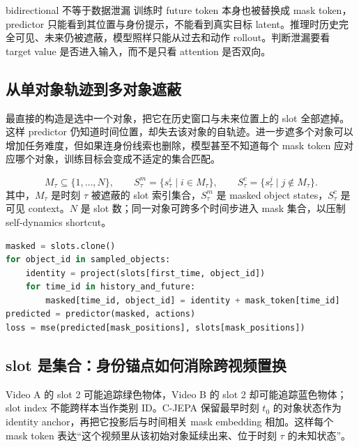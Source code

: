 \begin{warningbox}{bidirectional 不等于数据泄漏}
训练时 future token 本身也被替换成 mask token，predictor 只能看到其位置与身份提示，不能看到真实目标 latent。推理时历史完全可见、未来仍被遮蔽，模型照样只能从过去和动作 rollout。判断泄漏要看 target value 是否进入输入，而不是只看 attention 是否双向。
\end{warningbox}

\subsection{从单对象轨迹到多对象遮蔽}

最直接的构造是选中一个对象，把它在历史窗口与未来位置上的 slot 全部遮掉。这样 predictor 仍知道时间位置，却失去该对象的自轨迹。进一步遮多个对象可以增加任务难度，但如果连身份线索也删除，模型甚至不知道每个 mask token 应对应哪个对象，训练目标会变成不适定的集合匹配。




\[
M_\tau\subseteq\{1,\ldots,N\},
\qquad
S_\tau^m=\{s_\tau^i\mid i\in M_\tau\},
\qquad
S_\tau^c=\{s_\tau^j\mid j\notin M_\tau\}.
\]
其中，$M_\tau$ 是时刻 $\tau$ 被遮蔽的 slot 索引集合，$S_\tau^m$ 是 masked object states，$S_\tau^c$ 是可见 context。$N$ 是 slot 数；同一对象可跨多个时间步进入 mask 集合，以压制 self-dynamics shortcut。

\begin{lstlisting}[language=Python,caption={跨时间 object masking 的最小伪代码}]
masked = slots.clone()
for object_id in sampled_objects:
    identity = project(slots[first_time, object_id])
    for time_id in history_and_future:
        masked[time_id, object_id] = identity + mask_token[time_id]
predicted = predictor(masked, actions)
loss = mse(predicted[mask_positions], slots[mask_positions])
\end{lstlisting}

\subsection{slot 是集合：身份锚点如何消除跨视频置换}

Video A 的 slot 2 可能追踪绿色物体，Video B 的 slot 2 却可能追踪蓝色物体；slot index 不能跨样本当作类别 ID。C-JEPA 保留最早时刻 $t_0$ 的对象状态作为 identity anchor，再把它投影后与时间相关 mask embedding 相加。这样每个 mask token 表达``这个视频里从该初始对象延续出来、位于时刻 $\tau$ 的未知状态''。

